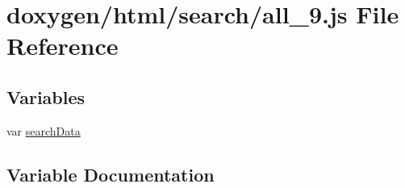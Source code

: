 \hypertarget{a00054}{}\section{doxygen/html/search/all\+\_\+9.js File Reference}
\label{a00054}
\subsection*{Variables}
\begin{DoxyCompactItemize}
\item 
var \hyperlink{a00054_ad01a7523f103d6242ef9b0451861231e}{search\+Data}
\end{DoxyCompactItemize}


\subsection{Variable Documentation}
\hypertarget{a00054_ad01a7523f103d6242ef9b0451861231e}{}
